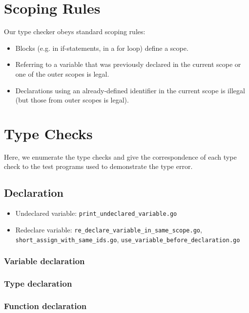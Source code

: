 \documentclass{article}
\begin{document}
\section*{Scoping Rules}

Our type checker obeys standard scoping rules:

\begin{itemize}
    \item Blocks (e.g. in if-statements, in a for loop) define a scope.
    \item Referring to a variable that was previously declared in the current scope or one of the outer scopes is legal.
    \item Declarations using an already-defined identifier in the current scope is illegal (but those from outer scopes is legal).
\end{itemize}

\section*{Type Checks}

Here, we enumerate the type checks and give the correspondence of each type check to the test programs used to demonstrate the type error.

\subsection*{Declaration}

\begin{itemize}
\item Undeclared variable: \texttt{print_undeclared_variable.go}
\item Redeclare variable: \texttt{re_declare_variable_in_same_scope.go}, \texttt{short_assign_with_same_ids.go}, \texttt{use_variable_before_declaration.go}
\end{itemize}

\subsubsection*{Variable declaration}
\subsubsection*{Type declaration}

\subsubsection*{Function declaration}
\end{document}
